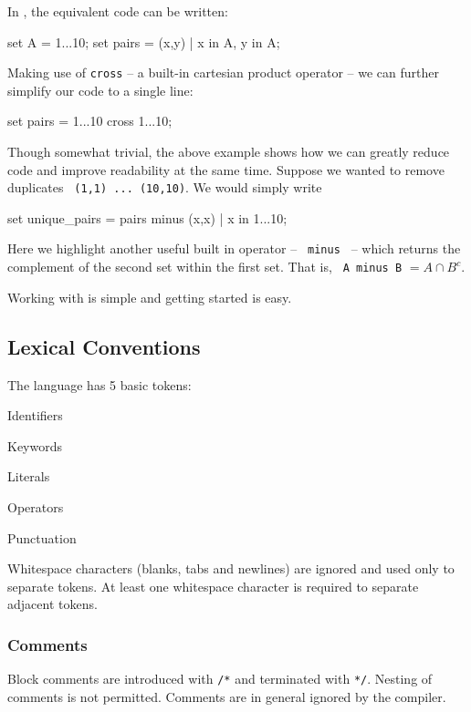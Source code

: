 In \lang , the equivalent code can be written:

\begin{code}
set A = {1...10};
set pairs = {(x,y) | x in A, y in A};
\end{code}

Making use of \verb|cross| -- a built-in cartesian product operator -- we can further simplify our code to a single line:

\begin{code}
set pairs = {1...10} cross {1...10};
\end{code}

Though somewhat trivial, the above example shows how we can greatly reduce code and improve readability at the same time.  Suppose we wanted to remove duplicates \verb| (1,1) ... (10,10)|.  We would simply write

\begin{code}
set unique_pairs = pairs minus {(x,x) | x in {1...10}};
\end{code}

Here we highlight another useful built in operator -- \verb| minus | -- which returns the complement of the second set within the first set.  That is, \verb| A minus B| $= A \cap B^c.$  

Working with \lang is simple and getting started is easy.

\subsection{Lexical Conventions}
The language has 5 basic tokens: 
\begin{myList}
	\item Identifiers
	\item Keywords
	\item Literals
	\item Operators
	\item Punctuation
\end{myList}
Whitespace characters (blanks, tabs and newlines) are ignored and used only to separate tokens.  At least one whitespace character is required to separate adjacent tokens.

\subsubsection{Comments}
Block comments are introduced with \verb|/*| and terminated with \verb|*/|.  Nesting of comments is not permitted.  Comments are in general ignored by the compiler.

